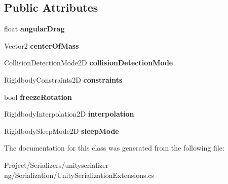 \subsection*{Public Attributes}
\begin{DoxyCompactItemize}
\item 
\mbox{\label{class_serialize_rigid_body2_d_1_1_rigid_body_info_a3f9bedb62fcbba4aaf6b9cfa2e3b0312}} 
float {\bfseries angular\+Drag}
\item 
\mbox{\label{class_serialize_rigid_body2_d_1_1_rigid_body_info_a2d7ee56387ef715efaea212b3ebafdd2}} 
Vector2 {\bfseries center\+Of\+Mass}
\item 
\mbox{\label{class_serialize_rigid_body2_d_1_1_rigid_body_info_a7e7fd47e14d4ba88984b267519a0edd3}} 
Collision\+Detection\+Mode2D {\bfseries collision\+Detection\+Mode}
\item 
\mbox{\label{class_serialize_rigid_body2_d_1_1_rigid_body_info_a6f74e2ed03d785da45b9fd297ab0bf3b}} 
Rigidbody\+Constraints2D {\bfseries constraints}
\item 
\mbox{\label{class_serialize_rigid_body2_d_1_1_rigid_body_info_abf143205ce2eae0445bc2450f0335949}} 
bool {\bfseries freeze\+Rotation}
\item 
\mbox{\label{class_serialize_rigid_body2_d_1_1_rigid_body_info_a6851bc1fa6864eeedb06ae0235cfd07b}} 
Rigidbody\+Interpolation2D {\bfseries interpolation}
\item 
\mbox{\label{class_serialize_rigid_body2_d_1_1_rigid_body_info_a193e813093d8d6d0c8c869748b3bddb7}} 
Rigidbody\+Sleep\+Mode2D {\bfseries sleep\+Mode}
\end{DoxyCompactItemize}


The documentation for this class was generated from the following file\+:\begin{DoxyCompactItemize}
\item 
Project/\+Serializers/unityserializer-\/ng/\+Serialization/Unity\+Serialization\+Extensions.\+cs\end{DoxyCompactItemize}
